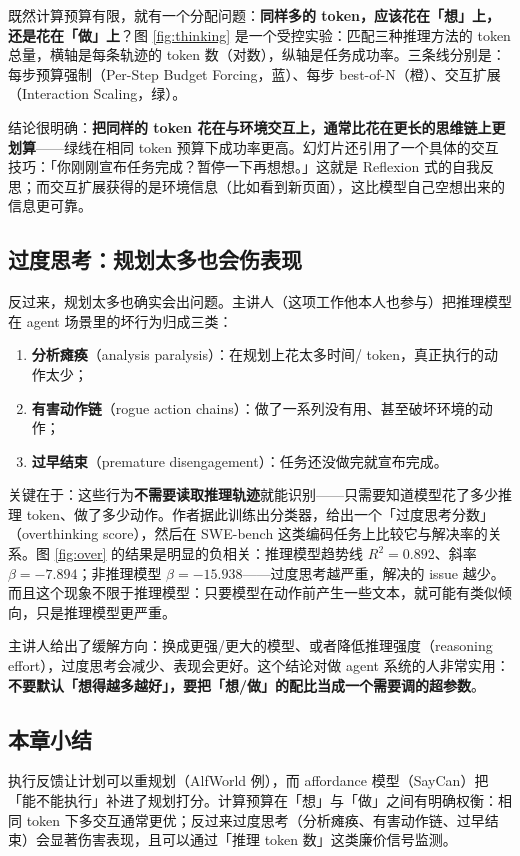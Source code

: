 \documentclass[a4paper]{article}
\begin{document}
既然计算预算有限，就有一个分配问题：\textbf{同样多的 token，应该花在「想」上，还是花在「做」上}？图 \ref{fig:thinking} 是一个受控实验：匹配三种推理方法的 token 总量，横轴是每条轨迹的 token 数（对数），纵轴是任务成功率。三条线分别是：每步预算强制（Per-Step Budget Forcing，蓝）、每步 best-of-N（橙）、交互扩展（Interaction Scaling，绿）。

结论很明确：\textbf{把同样的 token 花在与环境交互上，通常比花在更长的思维链上更划算}——绿线在相同 token 预算下成功率更高。幻灯片还引用了一个具体的交互技巧：「你刚刚宣布任务完成？暂停一下再想想。」这就是 Reflexion 式的自我反思；而交互扩展获得的是环境信息（比如看到新页面），这比模型自己空想出来的信息更可靠。

\subsection{过度思考：规划太多也会伤表现}

反过来，规划太多也确实会出问题。主讲人（这项工作他本人也参与）把推理模型在 agent 场景里的坏行为归成三类：

\begin{enumerate}
\item \textbf{分析瘫痪}（analysis paralysis）：在规划上花太多时间/ token，真正执行的动作太少；
\item \textbf{有害动作链}（rogue action chains）：做了一系列没有用、甚至破坏环境的动作；
\item \textbf{过早结束}（premature disengagement）：任务还没做完就宣布完成。
\end{enumerate}

关键在于：这些行为\textbf{不需要读取推理轨迹}就能识别——只需要知道模型花了多少推理 token、做了多少动作。作者据此训练出分类器，给出一个「过度思考分数」（overthinking score），然后在 SWE-bench 这类编码任务上比较它与解决率的关系。图 \ref{fig:over} 的结果是明显的负相关：推理模型趋势线 $R^2 = 0.892$、斜率 $\beta = -7.894$；非推理模型 $\beta = -15.938$——过度思考越严重，解决的 issue 越少。而且这个现象不限于推理模型：只要模型在动作前产生一些文本，就可能有类似倾向，只是推理模型更严重。

主讲人给出了缓解方向：换成更强/更大的模型、或者降低推理强度（reasoning effort），过度思考会减少、表现会更好。这个结论对做 agent 系统的人非常实用：\textbf{不要默认「想得越多越好」，要把「想/做」的配比当成一个需要调的超参数}。

\subsection{本章小结}
执行反馈让计划可以重规划（AlfWorld 例），而 affordance 模型（SayCan）把「能不能执行」补进了规划打分。计算预算在「想」与「做」之间有明确权衡：相同 token 下多交互通常更优；反过来过度思考（分析瘫痪、有害动作链、过早结束）会显著伤害表现，且可以通过「推理 token 数」这类廉价信号监测。
\end{document}
